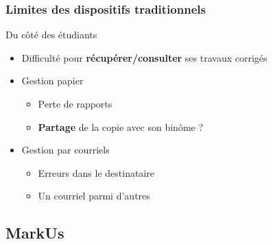 \documentclass[svgnames,hyperref, french, xcolor=dvipsnames,usenames]{beamer}		        %
\begin{document}
\frame
{
        \frametitle{Limites des dispositifs traditionnels}

        \begin{alertblock}{Du côté des étudiants}
                \begin{itemize}
                        \item Difficulté pour \textbf{récupérer/consulter} ses travaux corrigés
                        \item Gestion papier
                                \begin{itemize}
                                        \item Perte de rapports
                                        \item \textbf{Partage} de la copie avec son binôme ?
                                \end{itemize}
                        \item Gestion par courriels
                                \begin{itemize}
                                        \item Erreurs dans le destinataire
                                        \item Un courriel parmi d'autres
                                \end{itemize}
                \end{itemize}
        \end{alertblock}
}

\subsection*{MarkUs}


\end{document}
